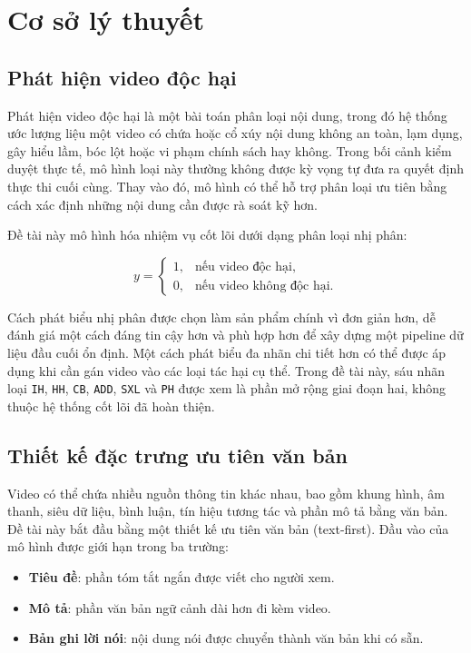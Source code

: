 \section{Cơ sở lý thuyết}

\subsection{Phát hiện video độc hại}

Phát hiện video độc hại là một bài toán phân loại nội dung, trong đó hệ thống ước lượng liệu một video có chứa hoặc cổ xúy nội dung không an toàn, lạm dụng, gây hiểu lầm, bóc lột hoặc vi phạm chính sách hay không. Trong bối cảnh kiểm duyệt thực tế, mô hình loại này thường không được kỳ vọng tự đưa ra quyết định thực thi cuối cùng. Thay vào đó, mô hình có thể hỗ trợ phân loại ưu tiên bằng cách xác định những nội dung cần được rà soát kỹ hơn.

Đề tài này mô hình hóa nhiệm vụ cốt lõi dưới dạng phân loại nhị phân:

\begin{equation}
    y =
    \begin{cases}
        1, & \text{nếu video độc hại},\\
        0, & \text{nếu video không độc hại}.
    \end{cases}
\end{equation}

Cách phát biểu nhị phân được chọn làm sản phẩm chính vì đơn giản hơn, dễ đánh giá một cách đáng tin cậy hơn và phù hợp hơn để xây dựng một pipeline dữ liệu đầu cuối ổn định. Một cách phát biểu đa nhãn chi tiết hơn có thể được áp dụng khi cần gán video vào các loại tác hại cụ thể. Trong đề tài này, sáu nhãn loại \texttt{IH}, \texttt{HH}, \texttt{CB}, \texttt{ADD}, \texttt{SXL} và \texttt{PH} được xem là phần mở rộng giai đoạn hai, không thuộc hệ thống cốt lõi đã hoàn thiện.

\subsection{Thiết kế đặc trưng ưu tiên văn bản}

Video có thể chứa nhiều nguồn thông tin khác nhau, bao gồm khung hình, âm thanh, siêu dữ liệu, bình luận, tín hiệu tương tác và phần mô tả bằng văn bản. Đề tài này bắt đầu bằng một thiết kế ưu tiên văn bản (text-first). Đầu vào của mô hình được giới hạn trong ba trường:

\begin{itemize}
    \item \textbf{Tiêu đề}: phần tóm tắt ngắn được viết cho người xem.
    \item \textbf{Mô tả}: phần văn bản ngữ cảnh dài hơn đi kèm video.
    \item \textbf{Bản ghi lời nói}: nội dung nói được chuyển thành văn bản khi có sẵn.
\end{itemize}

